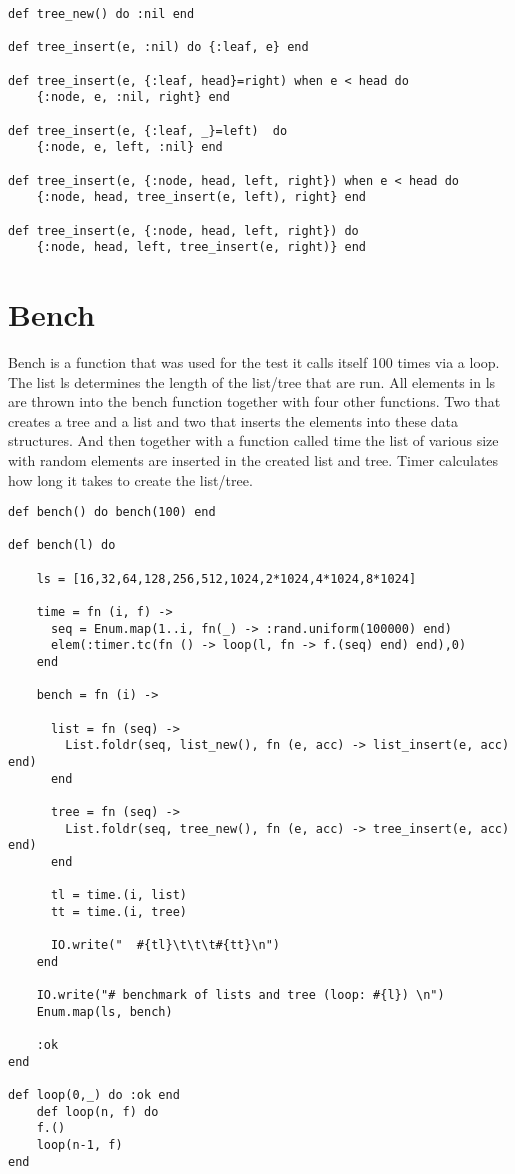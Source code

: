 \documentclass[a4paper,11pt]{article}
\begin{document}
\begin{verbatim}
def tree_new() do :nil end

def tree_insert(e, :nil) do {:leaf, e} end

def tree_insert(e, {:leaf, head}=right) when e < head do 
    {:node, e, :nil, right} end

def tree_insert(e, {:leaf, _}=left)  do 
    {:node, e, left, :nil} end
    
def tree_insert(e, {:node, head, left, right}) when e < head do 
    {:node, head, tree_insert(e, left), right} end
    
def tree_insert(e, {:node, head, left, right}) do
    {:node, head, left, tree_insert(e, right)} end
\end{verbatim}

\section{Bench}

Bench is a function that was used for the test it calls itself 100 times via a loop. The list ls determines the length of the list/tree that are run. All elements in ls are thrown into the bench function together with four other functions. Two that creates a tree and a list and two that inserts the elements into these data structures. And then together with a function called time the list of various size with random elements are inserted in the created list and tree. Timer calculates how long it takes to create the list/tree.

\begin{verbatim}
def bench() do bench(100) end

def bench(l) do

    ls = [16,32,64,128,256,512,1024,2*1024,4*1024,8*1024]
    
    time = fn (i, f) ->
      seq = Enum.map(1..i, fn(_) -> :rand.uniform(100000) end)
      elem(:timer.tc(fn () -> loop(l, fn -> f.(seq) end) end),0)
    end

    bench = fn (i) ->

      list = fn (seq) ->
        List.foldr(seq, list_new(), fn (e, acc) -> list_insert(e, acc) end)
      end
    
      tree = fn (seq) ->
        List.foldr(seq, tree_new(), fn (e, acc) -> tree_insert(e, acc) end)
      end
    
      tl = time.(i, list)
      tt = time.(i, tree)
    
      IO.write("  #{tl}\t\t\t#{tt}\n")
    end

    IO.write("# benchmark of lists and tree (loop: #{l}) \n")
    Enum.map(ls, bench)

    :ok
end

def loop(0,_) do :ok end
    def loop(n, f) do
    f.()
    loop(n-1, f)
end
\end{verbatim}
\end{document}
